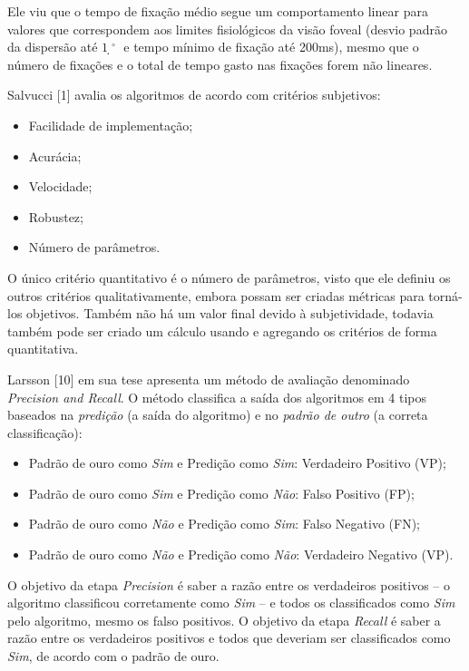 \documentclass[brazil,]{report}
\begin{document}
Ele viu que o tempo de fixação médio segue um comportamento linear para
valores que correspondem aos limites fisiológicos da visão foveal
(desvio padrão da dispersão até $1̣^\circ$ e tempo mínimo de fixação até
200ms), mesmo que o número de fixações e o total de tempo gasto nas
fixações forem não lineares.

Salvucci {[}1{]} avalia os algoritmos de acordo com critérios
subjetivos:

\begin{itemize}
\itemsep1pt\parskip0pt
\item
  Facilidade de implementação;
\item
  Acurácia;
\item
  Velocidade;
\item
  Robustez;
\item
  Número de parâmetros.
\end{itemize}

O único critério quantitativo é o número de parâmetros, visto que ele
definiu os outros critérios qualitativamente, embora possam ser criadas
métricas para torná-los objetivos. Também não há um valor final devido à
subjetividade, todavia também pode ser criado um cálculo usando e
agregando os critérios de forma quantitativa.

Larsson {[}10{]} em sua tese apresenta um método de avaliação denominado
\emph{Precision and Recall}. O método classifica a saída dos algoritmos
em 4 tipos baseados na \emph{predição} (a saída do algoritmo) e no
\emph{padrão de outro} (a correta classificação):

\begin{itemize}
\itemsep1pt\parskip0pt
\item
  Padrão de ouro como \emph{Sim} e Predição como \emph{Sim}: Verdadeiro
  Positivo (VP);
\item
  Padrão de ouro como \emph{Sim} e Predição como \emph{Não}: Falso
  Positivo (FP);
\item
  Padrão de ouro como \emph{Não} e Predição como \emph{Sim}: Falso
  Negativo (FN);
\item
  Padrão de ouro como \emph{Não} e Predição como \emph{Não}: Verdadeiro
  Negativo (VP).
\end{itemize}

O objetivo da etapa \emph{Precision} é saber a razão entre os
verdadeiros positivos -- o algoritmo classificou corretamente como
\emph{Sim} -- e todos os classificados como \emph{Sim} pelo algoritmo,
mesmo os falso positivos. O objetivo da etapa \emph{Recall} é saber a
razão entre os verdadeiros positivos e todos que deveriam ser
classificados como \emph{Sim}, de acordo com o padrão de ouro.
\end{document}
